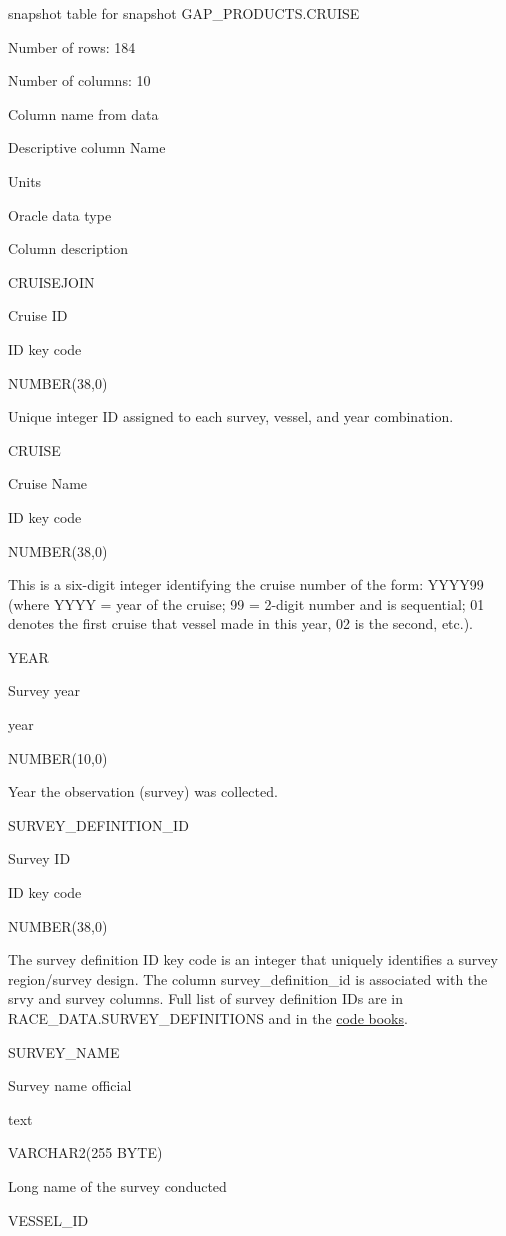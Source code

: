 \documentclass[
  letterpaper,
  oneside,
  open=any]{scrbook}
\begin{document}
snapshot table for snapshot GAP\_PRODUCTS.CRUISE

Number of rows: 184

Number of columns: 10

Column name from data

Descriptive column Name

Units

Oracle data type

Column description

CRUISEJOIN

Cruise ID

ID key code

NUMBER(38,0)

Unique integer ID assigned to each survey, vessel, and year combination.

CRUISE

Cruise Name

ID key code

NUMBER(38,0)

This is a six-digit integer identifying the cruise number of the form:
YYYY99 (where YYYY = year of the cruise; 99 = 2-digit number and is
sequential; 01 denotes the first cruise that vessel made in this year,
02 is the second, etc.).

YEAR

Survey year

year

NUMBER(10,0)

Year the observation (survey) was collected.

SURVEY\_DEFINITION\_ID

Survey ID

ID key code

NUMBER(38,0)

The survey definition ID key code is an integer that uniquely identifies
a survey region/survey design. The column survey\_definition\_id is
associated with the srvy and survey columns. Full list of survey
definition IDs are in RACE\_DATA.SURVEY\_DEFINITIONS and in the
\href{https://www.fisheries.noaa.gov/resource/document/groundfish-survey-species-code-manual-and-data-codes-manual}{code
books}.

SURVEY\_NAME

Survey name official

text

VARCHAR2(255 BYTE)

Long name of the survey conducted

VESSEL\_ID
\end{document}
